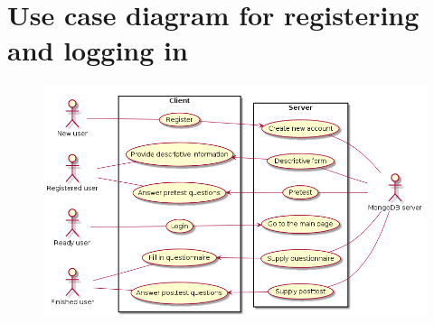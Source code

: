 \section{Use case diagram for registering and logging in}
\label{app:loginusecase}
\begin{figure}[h!]
\centering
\includegraphics[width=\textwidth]{img/loginusecase.png}
\end{figure}
